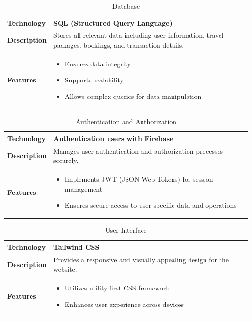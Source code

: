 \documentclass{scrreprt}
\begin{document}
    \begin{table}[ht]
    \centering
    \caption{Database}
    \begin{tabular}{|p{4cm}|p{10cm}|}
    \hline
    \textbf{Technology} & SQL (Structured Query Language) \\
    \hline
    \textbf{Description} & Stores all relevant data including user information, travel packages, bookings, and transaction details. \\
    \hline
    \textbf{Features} &
    \begin{itemize}[label=$\bullet$]
      \item Ensures data integrity
      \item Supports scalability
      \item Allows complex queries for data manipulation
    \end{itemize} \\
    \hline
    \end{tabular}
    \end{table}
    
    \vspace{0.5cm}
    
    \begin{table}[ht]
    \centering
    \caption{Authentication and Authorization}
    \begin{tabular}{|p{4cm}|p{10cm}|}
    \hline
    \textbf{Technology} & Authentication users with Firebase \\
    \hline
    \textbf{Description} & Manages user authentication and authorization processes securely. \\
    \hline
    \textbf{Features} &
    \begin{itemize}[label=$\bullet$]
      \item Implements JWT (JSON Web Tokens) for session management
      \item Ensures secure access to user-specific data and operations
    \end{itemize} \\
    \hline
    \end{tabular}
    \end{table}
    
    \vspace{0.5cm}
    
    \begin{table}[ht]
    \centering
    \caption{User Interface}
    \begin{tabular}{|p{4cm}|p{10cm}|}
    \hline
    \textbf{Technology} & Tailwind CSS \\
    \hline
    \textbf{Description} & Provides a responsive and visually appealing design for the website. \\
    \hline
    \textbf{Features} &
    \begin{itemize}[label=$\bullet$]
      \item Utilizes utility-first CSS framework
      \item Enhances user experience across devices
    \end{itemize} \\
    \hline
    \end{tabular}
    \end{table}
    
\end{document}
